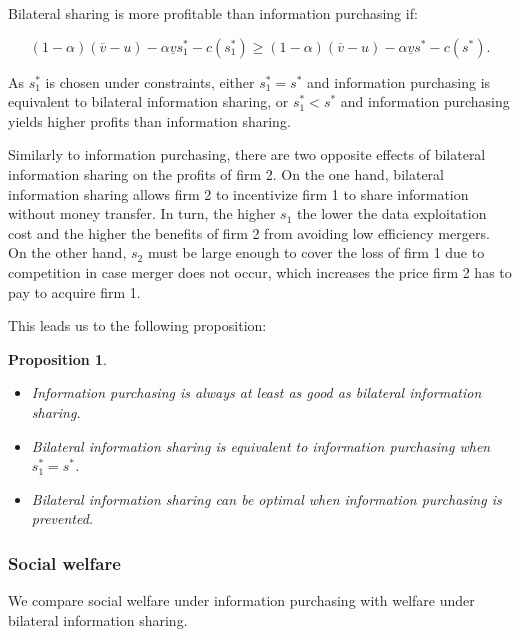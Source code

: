 \documentclass[a4paper,leqno]{article}%
\newtheorem{prop}{Proposition}
\renewcommand{\a}{\alpha}
\newcommand{\uv}{\underline{v}}
\newcommand{\ov}{\overline{v}}
\begin{document}
\medskip

Bilateral sharing is more profitable than information purchasing if:

$$(1-\a)(\ov-u)-\a\uv s_1^* -c(s_1^*)\geq(1-\a)(\ov -u)-\a \uv s^*-c(s^*).$$

\medskip

As $s_1^*$ is chosen under constraints, either $s_1^*=s^*$ and information purchasing is equivalent to bilateral information sharing, or $s_1^*< s^*$ and information purchasing yields higher profits than information sharing. 

\medskip
%
Similarly to information purchasing, there are two opposite effects of bilateral information sharing on the profits of firm 2. On the one hand, bilateral information sharing allows firm 2 to incentivize firm 1 to share information without money transfer. In turn, the higher $s_1$ the lower the data exploitation cost and the higher the benefits of firm 2 from avoiding low efficiency mergers. On the other hand, $s_2$ must be large enough to cover the loss of firm 1 due to competition in case merger does not occur, which increases the price firm 2 has to pay to acquire firm 1. 

\medskip

This leads us to the following proposition:

\begin{prop}~~\label{prop:1bil3}


\begin{itemize}
    \item Information purchasing is always at least as good as bilateral information sharing.  
    \item Bilateral information sharing is equivalent to information purchasing when $s_1^*=s^*$.
    \item Bilateral information sharing can be optimal when information purchasing is prevented.
\end{itemize}

\end{prop}

\medskip

\subsubsection{Social welfare}

\medskip

We compare social welfare under information purchasing with welfare under bilateral information sharing. 
\end{document}
